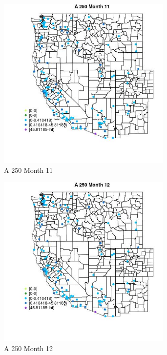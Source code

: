 \begin{figure} 
\centering  
\includegraphics[width=0.77\textwidth]{Code_Outputs/Report_ML_input_PM25_Step4_part_e_de_duplicated_aves_MapObsMo11A_250.jpg} 
\caption{\label{fig:Report_ML_input_PM25_Step4_part_e_de_duplicated_avesMapObsMo11A_250}A 250 Month 11} 
\end{figure} 
 

\clearpage 

\begin{figure} 
\centering  
\includegraphics[width=0.77\textwidth]{Code_Outputs/Report_ML_input_PM25_Step4_part_e_de_duplicated_aves_MapObsMo12A_250.jpg} 
\caption{\label{fig:Report_ML_input_PM25_Step4_part_e_de_duplicated_avesMapObsMo12A_250}A 250 Month 12} 
\end{figure} 
 


